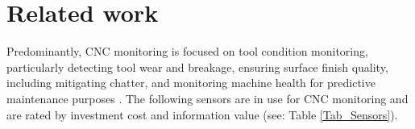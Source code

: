 \documentclass[5p,times,procedia]{elsarticle}
\begin{document}
 
\section{Related work}\label{Sec_RelatedWork}




Predominantly, CNC monitoring is focused on tool condition monitoring, particularly detecting tool wear and breakage, ensuring surface finish quality, including mitigating chatter, and monitoring machine health for predictive maintenance purposes \cite[p.2727]{Kuntoglu.Salur.ea2021}.
The following sensors are in use for CNC monitoring and are rated by investment cost and information value (see: Table \ref{Tab_Sensors}).
\vspace*{-.5\baselineskip}
\end{document}
